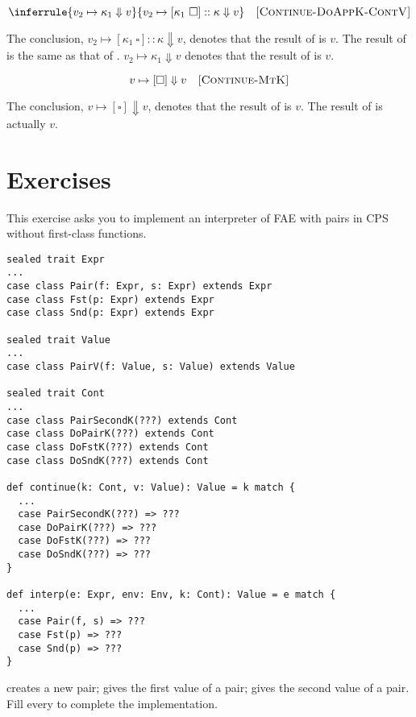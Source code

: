 \[
  \inferrule
  { v_2\mapsto\kappa_1\Downarrow v }
  { v_2\mapsto[\kappa_1\ \square]::\kappa\Downarrow v }
  \quad\textsc{[Continue-DoAppK-ContV]}
\]

The conclusion, $v_2\mapsto[\kappa_1\ \square]::\kappa\Downarrow v$, denotes that
the result of 
is $v$. The result of  is the same as that of .
$v_2\mapsto\kappa_1\Downarrow v$ denotes that the result of
 is $v$.

\[
  v\mapsto[\square]\Downarrow v
  \quad\textsc{[Continue-MtK]}
\]

The conclusion, $v\mapsto[\square]\Downarrow v$, denotes that the result of
 is $v$. The result of  is
actually $v$.

\section{Exercises}

\begin{exercise}

This exercise asks you to implement an interpreter of \textsf{FAE}
with pairs in CPS without first-class functions.

\begin{verbatim}
sealed trait Expr
...
case class Pair(f: Expr, s: Expr) extends Expr
case class Fst(p: Expr) extends Expr
case class Snd(p: Expr) extends Expr

sealed trait Value
...
case class PairV(f: Value, s: Value) extends Value

sealed trait Cont
...
case class PairSecondK(???) extends Cont
case class DoPairK(???) extends Cont
case class DoFstK(???) extends Cont
case class DoSndK(???) extends Cont

def continue(k: Cont, v: Value): Value = k match {
  ...
  case PairSecondK(???) => ???
  case DoPairK(???) => ???
  case DoFstK(???) => ???
  case DoSndK(???) => ???
}

def interp(e: Expr, env: Env, k: Cont): Value = e match {
  ...
  case Pair(f, s) => ???
  case Fst(p) => ???
  case Snd(p) => ???
}
\end{verbatim}

 creates a new pair;  gives the first value of a
pair;  gives the second value of a pair.  Fill every 
to complete the implementation.

\end{exercise}
